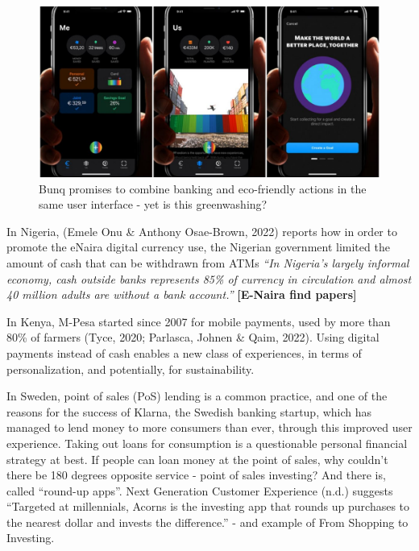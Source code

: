 \documentclass[
  letterpaper,
  DIV=11,
  numbers=noendperiod]{scrartcl}
\begin{document}
\begin{figure}[H]

{\centering \includegraphics[width=1\textwidth,height=\textheight]{./images/finance/bunq.jpg}

}

\caption{Bunq promises to combine banking and eco-friendly actions in
the same user interface - yet is this greenwashing?}

\end{figure}%

In Nigeria, (Emele Onu \& Anthony Osae-Brown, 2022) reports how in order
to promote the eNaira digital currency use, the Nigerian government
limited the amount of cash that can be withdrawn from ATMs \emph{``In
Nigeria's largely informal economy, cash outside banks represents 85\%
of currency in circulation and almost 40 million adults are without a
bank account.''} \textbf{{[}E-Naira find papers{]}}

In Kenya, M-Pesa started since 2007 for mobile payments, used by more
than 80\% of farmers (Tyce, 2020; Parlasca, Johnen \& Qaim, 2022). Using
digital payments instead of cash enables a new class of experiences, in
terms of personalization, and potentially, for sustainability.

In Sweden, point of sales (PoS) lending is a common practice, and one of
the reasons for the success of Klarna, the Swedish banking startup,
which has managed to lend money to more consumers than ever, through
this improved user experience. Taking out loans for consumption is a
questionable personal financial strategy at best. If people can loan
money at the point of sales, why couldn't there be 180 degrees opposite
service - point of sales investing? And there is, called ``round-up
apps''. Next Generation Customer Experience (n.d.) suggests ``Targeted
at millennials, Acorns is the investing app that rounds up purchases to
the nearest dollar and invests the difference.'' - and example of From
Shopping to Investing.
\end{document}

